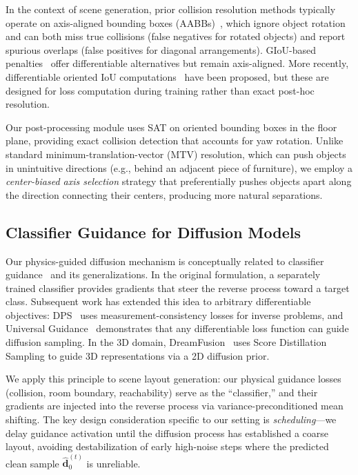 In the context of scene generation, prior collision resolution methods typically operate on axis-aligned bounding boxes (AABBs)~\cite{placeholder_aabb_methods}, which ignore object rotation and can both miss true collisions (false negatives for rotated objects) and report spurious overlaps (false positives for diagonal arrangements).
GIoU-based penalties~\cite{placeholder_giou} offer differentiable alternatives but remain axis-aligned.
More recently, differentiable oriented IoU computations~\cite{placeholder_oriented_iou_zhou} have been proposed, but these are designed for loss computation during training rather than exact post-hoc resolution.

Our post-processing module uses SAT on oriented bounding boxes in the floor plane, providing exact collision detection that accounts for yaw rotation.
Unlike standard minimum-translation-vector (MTV) resolution, which can push objects in unintuitive directions (e.g., behind an adjacent piece of furniture), we employ a \emph{center-biased axis selection} strategy that preferentially pushes objects apart along the direction connecting their centers, producing more natural separations.

\subsection{Classifier Guidance for Diffusion Models}
\label{sec:related:classifier_guidance}

Our physics-guided diffusion mechanism is conceptually related to classifier guidance~\cite{placeholder_classifier_guidance_dhariwal} and its generalizations.
In the original formulation, a separately trained classifier provides gradients that steer the reverse process toward a target class.
Subsequent work has extended this idea to arbitrary differentiable objectives: DPS~\cite{placeholder_dps} uses measurement-consistency losses for inverse problems, and Universal Guidance~\cite{placeholder_universal_guidance} demonstrates that any differentiable loss function can guide diffusion sampling.
In the 3D domain, DreamFusion~\cite{placeholder_dreamfusion} uses Score Distillation Sampling to guide 3D representations via a 2D diffusion prior.

We apply this principle to scene layout generation: our physical guidance losses (collision, room boundary, reachability) serve as the ``classifier,'' and their gradients are injected into the reverse process via variance-preconditioned mean shifting.
The key design consideration specific to our setting is \emph{scheduling}---we delay guidance activation until the diffusion process has established a coarse layout, avoiding destabilization of early high-noise steps where the predicted clean sample $\hat{\mathbf{d}}_0^{(t)}$ is unreliable.
